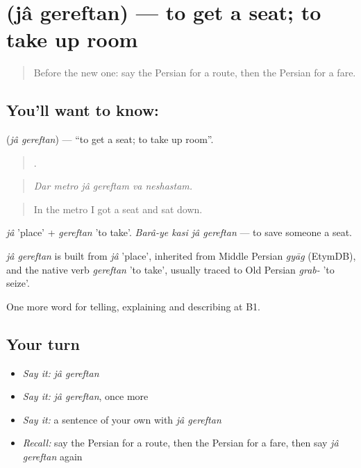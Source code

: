 \section[\texorpdfstring{\fa{جا} \fa{گرفتن} (jâ gereftan)}{جا گرفتن (jâ gereftan)}]{  (jâ gereftan) — to get a seat; to take up room}

\label{lesson:FA-C434-ja-gereftan}



\begin{quote}
Before the new one: say the Persian for a route, then the Persian for a fare.
\end{quote}

\subsection*{You'll want to know:  }
\textbf{ } (\emph{jâ gereftan}) — \textquotedblleft{}to get a seat; to take up room\textquotedblright{}.

\begin{quote}
     .
\end{quote}

\begin{quote}
\emph{Dar metro jâ gereftam va neshastam.}
\end{quote}

\begin{quote}
In the metro I got a seat and sat down.
\end{quote}

\emph{jâ} 'place' + \emph{gereftan} 'to take'. \emph{Barâ-ye kasi jâ gereftan} — to save someone a seat.

\begin{cousinweb}
\emph{jâ gereftan} is built from \emph{jâ} 'place', inherited from Middle Persian \emph{gyāg} (EtymDB), and the native verb \emph{gereftan} 'to take', usually traced to Old Persian \emph{grab-} 'to seize'.
\end{cousinweb}

\begin{grammarlens}[title={What you've built}]
One more word for telling, explaining and describing at B1.
\end{grammarlens}

\subsection*{Your turn}
\begin{itemize}
\raggedright
  \item \emph{Say it:} \emph{jâ gereftan}
  \item \emph{Say it:} \emph{jâ gereftan}, once more
  \item \emph{Say it:} a sentence of your own with \emph{jâ gereftan}
  \item \emph{Recall:} say the Persian for a route, then the Persian for a fare, then say \emph{jâ gereftan} again
\end{itemize}

